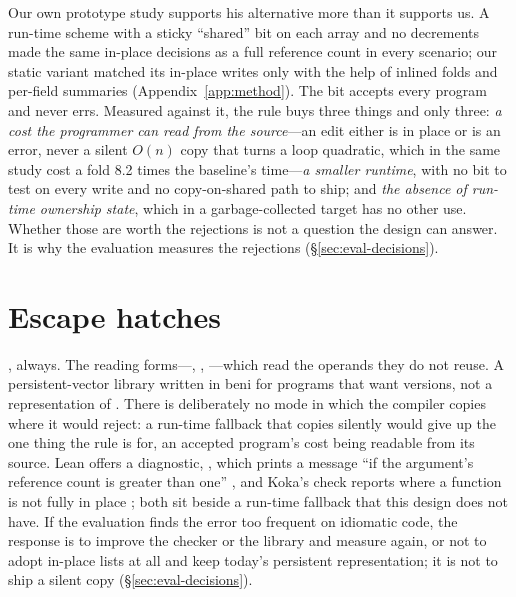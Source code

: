 Our own prototype study supports his alternative more than it supports us. A run-time scheme with a
sticky ``shared'' bit on each array and no decrements made the same in-place decisions as a full
reference count in every scenario; our static variant matched its in-place writes only with the help
of inlined folds and per-field summaries (Appendix~\ref{app:method}). The bit accepts every program and
never errs. Measured against it, the rule buys three things and only three: \emph{a cost the programmer
can read from the source}---an edit either is in place or is an error, never a silent $O(n)$ copy that
turns a loop quadratic, which in the same study cost a fold 8.2 times the baseline's time---\emph{a
smaller runtime}, with no bit to test on every write and no copy-on-shared path to ship; and \emph{the
absence of run-time ownership state}, which in a garbage-collected target has no other use. Whether those
are worth the rejections is not a question the design can answer. It is why the evaluation measures the
rejections (\S\ref{sec:eval-decisions}).

\section{Escape hatches}
\label{sec:disc-hatches}

, always. The reading forms---, , ---which
read the operands they do not reuse. A persistent-vector library written in beni for programs that want
versions, not a representation of . There is deliberately no mode in which the compiler copies
where it would reject: a run-time fallback that copies silently would give up the one thing the rule is
for, an accepted program's cost being readable from its source. Lean offers a diagnostic,
, which prints a message ``if the argument's reference count is greater than one''
\citep{lean2025rc}, and Koka's  check reports where a function is not fully in place
\citep{lorenzen2023fp2}; both sit beside a run-time fallback that this design does not have. If the
evaluation finds the error too frequent on idiomatic code, the response is to improve the checker or the
library and measure again, or not to adopt in-place lists at all and keep today's persistent
representation; it is not to ship a silent copy (\S\ref{sec:eval-decisions}).
